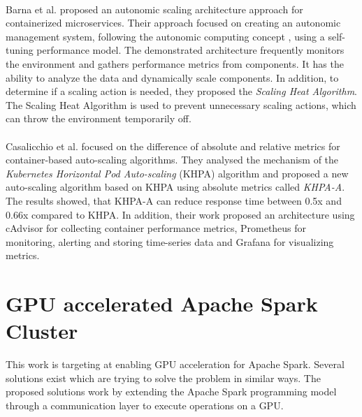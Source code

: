 \paragraph{}Barna et al. \cite{Barna2017ElasticContainerApps} proposed an autonomic scaling architecture approach for containerized microservices. Their approach focused on creating an autonomic management system, following the autonomic computing concept \cite{Kephart2003VisionComputing}, using a self-tuning performance model. The demonstrated architecture frequently monitors the environment and gathers performance metrics from components. It has the ability to analyze the data and dynamically scale components. In addition, to determine if a scaling action is needed, they proposed the \textit{Scaling Heat Algorithm}. The Scaling Heat Algorithm is used to prevent unnecessary scaling actions, which can throw the environment temporarily off.


\paragraph{}Casalicchio et al. \cite{Casalicchio2017AutoScaleCont} focused on the difference of absolute and relative metrics for container-based auto-scaling algorithms. They analysed the mechanism of the \textit{Kubernetes Horizontal Pod Auto-scaling} (KHPA) algorithm and proposed a new auto-scaling algorithm based on KHPA using absolute metrics called \textit{KHPA-A}. The results showed, that KHPA-A can reduce response time between 0.5x and 0.66x compared to KHPA. In addition, their work proposed an architecture using cAdvisor for collecting container performance metrics, Prometheus for monitoring, alerting and storing time-series data and Grafana for visualizing metrics.


\section{GPU accelerated Apache Spark Cluster}
This work is targeting at enabling GPU acceleration for Apache Spark.
Several solutions exist which are trying to solve the problem in similar ways.
The proposed solutions work by extending the Apache Spark programming model through a communication layer to execute operations on a GPU.



